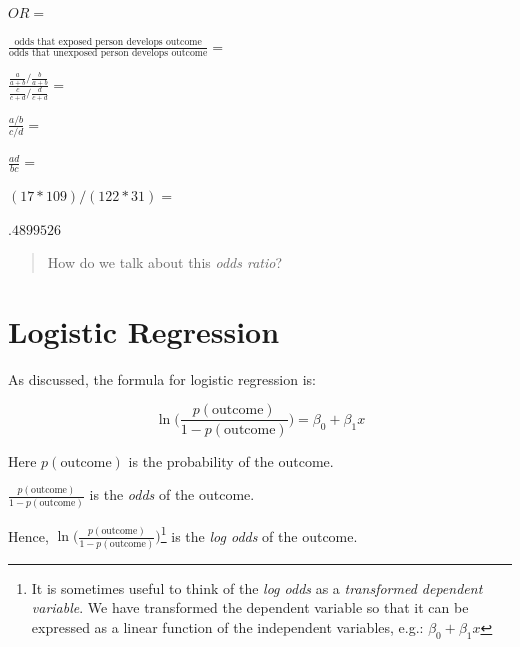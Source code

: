 \documentclass[
  letterpaper,
  DIV=11,
  numbers=noendperiod]{scrartcl}
\begin{document}
\(OR =\)

\(\frac{\text{odds that exposed person develops outcome}}{\text{odds that unexposed person develops outcome}} =\)

\(\frac{\frac{a}{a+b} / \frac{b}{a+b}}{\frac{c}{c+d} / \frac{d}{c+d}} =\)

\(\frac{a/b}{c/d} =\)

\(\frac{ad}{bc} =\)

\((17 * 109)/(122 * 31) =\)

\(.4899526\)

\begin{quote}
How do we talk about this \emph{odds ratio}?
\end{quote}

\hypertarget{logistic-regression}{%
\section{Logistic Regression}\label{logistic-regression}}

As discussed, the formula for logistic regression is:

\[\ln \Big(\frac{p(\text{outcome})}{1-p(\text{outcome})} \Big) = \beta_0 + \beta_1 x\]

Here \(p(\text{outcome})\) is the probability of the outcome.

\(\frac{p(\text{outcome})}{1-p(\text{outcome})}\) is the \emph{odds} of
the outcome.

Hence,
\(\ln \Big(\frac{p(\text{outcome})}{1-p(\text{outcome})} \Big)\)\footnote{It
  is sometimes useful to think of the \emph{log odds} as a
  \emph{transformed dependent variable}. We have transformed the
  dependent variable so that it can be expressed as a linear function of
  the independent variables, e.g.: \(\beta_0 + \beta_1 x\)} is the
\emph{log odds} of the outcome.
\end{document}
